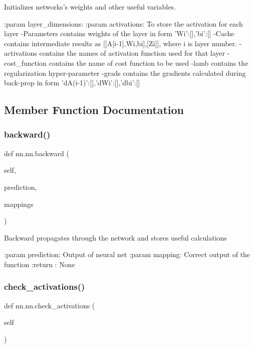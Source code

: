 \begin{DoxyVerb}Initializes networks's weights and other useful variables.

:param layer_dimensions:
:param activations: To store the activation for each layer
-Parameters contains weights of the layer in form {'Wi':[],'bi':[]}
-Cache contains intermediate results as [[A[i-1],Wi,bi],[Zi]], where i
 is layer number.
-activations contains the names of activation function used for that layer
-cost_function  contains the name of cost function to be used
-lamb contains the regularization hyper-parameter
-grads contains the gradients calculated during back-prop in form {'dA(i-1)':[],'dWi':[],'dbi':[]}
\end{DoxyVerb}
 

\subsection{Member Function Documentation}
\mbox{\label{classnn_1_1nn_a53a7beb698fe127ebb1f636fccbaa126}} 
\subsubsection{\texorpdfstring{backward()}{backward()}}
{\footnotesize\ttfamily def nn.\+nn.\+backward (\begin{DoxyParamCaption}\item[{}]{self,  }\item[{}]{prediction,  }\item[{}]{mappings }\end{DoxyParamCaption})}

\begin{DoxyVerb}Backward propagates through the network and stores useful calculations

:param prediction: Output of neural net
:param mapping: Correct output of the function
:return : None
\end{DoxyVerb}
 \mbox{\label{classnn_1_1nn_a15ee3f3e18ebae83c904b3441ece897d}} 
\subsubsection{\texorpdfstring{check\+\_\+activations()}{check\_activations()}}
{\footnotesize\ttfamily def nn.\+nn.\+check\+\_\+activations (\begin{DoxyParamCaption}\item[{}]{self }\end{DoxyParamCaption})}

